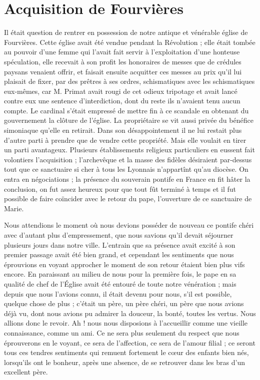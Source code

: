 \section*{Acquisition de Fourvières}
Il était question de rentrer en possession de notre antique et vénérable église de Fourvières. Cette église avait été vendue pendant la Révolution ; elle était tombée au pouvoir d'une femme qui l'avait fait servir à l'exploitation d'une honteuse spéculation, elle recevait à son profit les honoraires de messes que de crédules paysans venaient offrir, et faisait ensuite acquitter ces messes au prix qu'il lui plaisait de fixer, par des prêtres à ses ordres, schismatiques avec les schismatiques eux-mêmes, car M. Primat avait rougi de cet odieux tripotage et avait lancé contre eux une sentence d'interdiction, dont du reste ils n'avaient tenu aucun compte. Le cardinal s'était empressé de mettre fin à ce scandale en obtenant du gouvernement la clôture de l'église. La propriétaire se vit aussi privée du bénéfice simoniaque qu'elle en retirait. Dans son désappointement il ne lui restait plus d'autre parti à prendre que de vendre cette propriété. Mais elle voulait en tirer un parti avantageux. Plusieurs établissements religieux particuliers en eussent fait volontiers l'acquisition ; l'archevêque et la masse des fidèles désiraient par-dessus tout que ce sanctuaire si cher à tous les Lyonnais n'appartînt qu'au diocèse. On entra en négociations ; la présence du souverain pontife en France en fit hâter la conclusion, on fut assez heureux pour que tout fût terminé à temps et il fut possible de faire coïncider avec le retour du pape, l'ouverture de ce sanctuaire de Marie.

Nous attendions le moment où nous devions posséder de
nouveau ce pontife chéri avec d'autant plus d'empressement, que nous savions qu'il devait séjourner plusieurs jours dans notre ville. L'entrain que sa présence avait excité à son premier passage avait été bien grand, et cependant les sentiments que nous éprouvions en voyant approcher le moment de son retour étaient bien plus vifs encore. En paraissant au milieu de nous pour la première fois, le pape en sa qualité de chef de l'Église avait été entouré de toute notre vénération ; mais depuis que nous l'avions connu, il était devenu pour nous, s'il est possible, quelque chose de plus ; c'était un père, un père chéri, un père que nous avions déjà vu, dont nous avions pu admirer la douceur, la bonté, toutes les vertus. Nous allions donc le revoir. Ah ! nous nous disposions à l'accueillir comme une vieille connaissance, comme un ami. Ce ne sera plus seulement du respect que nous éprouverons en le voyant, ce sera de l'affection, ce sera de l'amour filial ; ce seront tous ces tendres sentiments qui remuent fortement le cœur des enfants bien nés, lorsqu'ils ont le bonheur, après une absence, de se retrouver dans les bras d'un excellent père.

